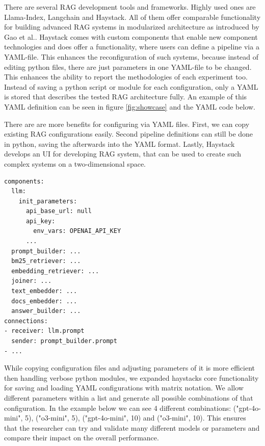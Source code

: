 There are several RAG development tools and frameworks. Highly used ones are Llama-Index\cite{Liu_LlamaIndex_2022}, Langchain\cite{Chase_LangChain_2022} and Haystack\cite{Pietsch_Haystack_the_end-to-end_2019}. All of them offer comparable functionality for building advanced RAG systems in modularized architecture as introduced by Gao et al.\cite{Gao.18.12.2023}. Haystack comes with custom components that enable new component technologies and does offer a functionality, where users can define a pipeline via a YAML-file. This enhances the reconfiguration of such systems, because instead of editing python files, there are just parameters in one YAML-file to be changed. This enhances the ability to report the methodologies of each experiment too. Instead of saving a python script or module for each configuration, only a YAML is stored that describes the tested RAG architecture fully. An example of this YAML definition can be seen in figure \ref{fig:showcase} and the YAML code below.

There are are more benefits for configuring via YAML files. First, we can copy existing RAG configurations easily. Second pipeline definitions can still be done in python, saving the afterwards into the YAML format. Lastly, Haystack develops an UI\cite{haystack-ui} for developing RAG system, that can be used to create such complex systems on a two-dimensional space.

\begin{verbatim}
components:
  llm:
    init_parameters:
      api_base_url: null
      api_key:
        env_vars: OPENAI_API_KEY
      ...
  prompt_builder: ...
  bm25_retriever: ...
  embedding_retriever: ...
  joiner: ...
  text_embedder: ...
  docs_embedder: ...
  answer_builder: ...
connections:
- receiver: llm.prompt
  sender: prompt_builder.prompt
- ...
\end{verbatim}

While copying configuration files and adjusting parameters of it is more efficient then handling verbose python modules, we expanded haystacks core functionality for saving and loading YAML configurations with matrix notation.
We allow different parameters within a list and generate all possible combinations of that configuration. In the example below we can see 4 different combinations: ("gpt-4o-mini", 5), ("o3-mini", 5), ("gpt-4o-mini", 10) and ("o3-mini", 10). This ensures that the researcher can try and validate many different models or parameters and compare their impact on the overall performance.

